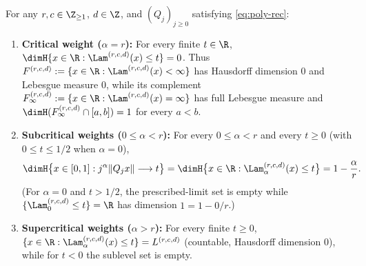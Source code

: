 \begin{theorem}\label{thm:poly-phase-transition}
For any $r,c\in\Z_{\ge1}$, $d\in\Z$, and $(Q_j)_{j\ge0}$ satisfying \eqref{eq:poly-rec}:
\begin{enumerate}[label=(\roman*),leftmargin=2em]
\item \textbf{Critical weight ($\alpha=r$):} For every finite $t\in\R$,
$\dimH\{x\in\R:\Lam^{(r,c,d)}(x)\le t\}=0$. Thus
$F^{(r,c,d)}:=\{x\in\R:\Lam^{(r,c,d)}(x)<\infty\}$ has Hausdorff dimension $0$
and Lebesgue measure $0$, while its complement
$F_\infty^{(r,c,d)}:=\{x\in\R:\Lam^{(r,c,d)}(x)=\infty\}$ has full Lebesgue
measure and $\dimH(F_\infty^{(r,c,d)}\cap[a,b])=1$ for every $a<b$.
\item \textbf{Subcritical weights ($0\le\alpha<r$):} For every $0\le\alpha<r$ and
every $t\ge0$ (with $0\le t\le1/2$ when $\alpha=0$),
\[
\dimH\bigl\{x\in[0,1]:j^\alpha\|Q_jx\|\longrightarrow t\bigr\}
=\dimH\bigl\{x\in\R:\Lam_\alpha^{(r,c,d)}(x)\le t\bigr\}
=1-\frac{\alpha}{r}.
\]
(For $\alpha=0$ and $t>1/2$, the prescribed-limit set is empty while
$\{\Lam_0^{(r,c,d)}\le t\}=\R$ has dimension $1=1-0/r$.)
\item \textbf{Supercritical weights ($\alpha>r$):} For every finite $t\ge0$,
$\{x\in\R:\Lam_\alpha^{(r,c,d)}(x)\le t\}=L^{(r,c,d)}$ (countable, Hausdorff
dimension $0$), while for $t<0$ the sublevel set is empty.
\end{enumerate}
\end{theorem}

